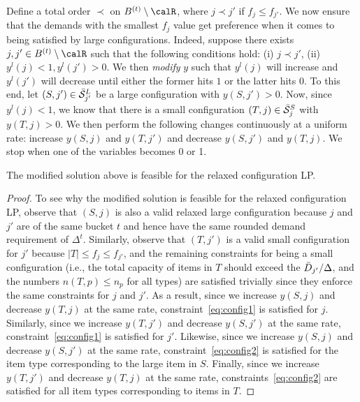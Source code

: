 \medskip {}  Define a total order $\prec$ on $B^\brt \setminus \calR$, where $j \prec j'$ if $f_{j} \leq f_{j'}$.  We now ensure that the demands with the smallest $f_j$ value get preference when it comes to being satisfied by large configurations. Indeed, suppose there exists $j,j' \in B^\brt \setminus \calR$ such that the following conditions hold: (i) $j \prec j'$, (ii) $y^l(j) < 1, y^l(j') > 0$. We then \emph{modify} $y$ such that
$y^l(j)$ will increase and $y^l(j')$ will decrease until either the former hits $1$ or the latter hits $0$. To this end, let $(S,j') \in \bar{\cal S}^L_{j'}$ be a large configuration  with $y(S,j') > 0$. Now, since $y^l(j) < 1$, we know that there is a small configuration $(T,j) \in \bar{\cal S}^S_j$ with $y(T,j) > 0$. We then perform the following changes continuously at a uniform rate: increase $y(S,j)$ and $y(T,j')$ and decrease $y(S,j')$ and $y(T,j)$. We stop when one of the variables becomes 0 or 1. 

\begin{claim} \label{cl:swap1}
The modified solution above is feasible for the relaxed configuration LP.
\end{claim}
\begin{proof}
To see why the modified solution is feasible for the relaxed configuration LP, observe that $(S,j)$ is also a valid relaxed large configuration because $j$ and $j'$ are of the same bucket $t$ and hence have the same rounded demand requirement of $\Delta^t$. Similarly, observe that $(T,j')$ is a valid small configuration for $j'$ because $|T| \leq f_{j} \leq f_{j'}$, and the remaining constraints for being a small configuration (i.e., the total capacity of items in $T$ should exceed the ${\bar D}_{j'}/\Delta$, and the numbers $n(T,p) \leq n_p$ for all types) are satisfied trivially since they enforce the same constraints for $j$ and $j'$. As a result, since we increase $y(S,j)$ and decrease $y(T,j)$ at the same rate, constraint~\cref{eq:config1} is satisfied for $j$. Similarly, since we increase $y(T,j')$ and decrease $y(S,j')$ at the same rate, constraint~\cref{eq:config1} is satisfied for $j'$. Likewise, since we increase $y(S,j)$ and decrease $y(S,j')$ at the same rate, constraint~\cref{eq:config2} is satisfied for the item type corresponding to the large item in $S$. Finally, since we increase $y(T,j')$ and decrease $y(T,j)$ at the same rate, constraints~\cref{eq:config2} are satisfied for all item types corresponding to items in $T$.
\end{proof}

